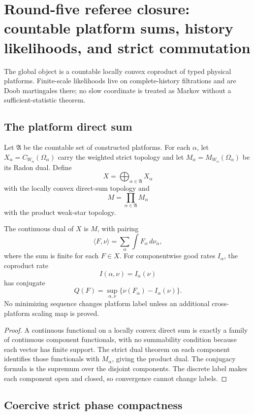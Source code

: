\section{Round-five referee closure: countable platform sums, history likelihoods, and strict commutation}
\label{sec:r5-c2}

The global object is a countable locally convex coproduct of typed physical
platforms.  Finite-scale likelihoods live on complete-history filtrations and
are Doob martingales there; no slow coordinate is treated as Markov without a
sufficient-statistic theorem.

\subsection{The platform direct sum}

Let \({\mathfrak A}\) be the countable set of constructed platforms.  For
each \(\alpha\), let \(X_\alpha=C_{W_\alpha}(\Omega_\alpha)\) carry the
weighted strict topology and let
\(M_\alpha=M_{W_\alpha}(\Omega_\alpha)\) be its Radon dual.  Define
\[
 X=\bigoplus_{\alpha\in{\mathfrak A}}X_\alpha
\]
with the locally convex direct-sum topology and
\[
 M=\prod_{\alpha\in{\mathfrak A}}M_\alpha
\]
with the product weak-star topology.

\begin{theorem}
\label{thm:r5-c2-sum}
The continuous dual of \(X\) is \(M\), with pairing
\[
 \langle F,\nu\rangle
 =\sum_\alpha\int F_\alpha\,d\nu_\alpha,
\]
where the sum is finite for each \(F\in X\).  For componentwise good rates
\(I_\alpha\), the coproduct rate
\[
 I(\alpha,\nu)=I_\alpha(\nu)
\]
has conjugate
\[
 Q(F)=\sup_{\alpha,\nu}
 \{\nu(F_\alpha)-I_\alpha(\nu)\}.
\]
No minimizing sequence changes platform label unless an additional
cross-platform scaling map is proved.
\end{theorem}

\begin{proof}
A continuous functional on a locally convex direct sum is exactly a family
of continuous component functionals, with no summability condition because
each vector has finite support.  The strict dual theorem on each component
identifies those functionals with \(M_\alpha\), giving the product dual.
The conjugacy formula is the supremum over the disjoint components.
The discrete label makes each component open and closed, so convergence
cannot change labels.
\end{proof}

\subsection{Coercive strict phase compactness}

